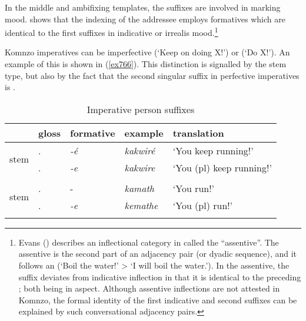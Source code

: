 In the middle and ambifixing templates, the  suffixes are involved in marking  mood.  shows that the indexing of the addressee employs formatives which are identical to the first  suffixes in indicative or irrealis mood.\footnote{Evans (\citeyear{Evans:2012ue}) describes an inflectional category in  called the ``assentive''. The assentive is the second part of an adjacency pair (or dyadic sequence), and it follows an  (`Boil the water!' > `I will boil the water.'). In the assentive, the  suffix deviates from indicative inflection in that it is identical to the preceding ; both being  in  aspect. Although assentive inflections are not attested in Komnzo, the formal identity of the first  indicative and second   suffixes can be explained by such conversational adjacency pairs.}

Komnzo imperatives can be imperfective (`Keep on doing X!') or  (`Do X!'). An example of this is shown in (\ref{ex766}). This distinction is signalled by the stem type, but also by the fact that the second singular suffix in perfective imperatives is .

\begin{table}
\caption{Imperative person suffixes}
\label{perssuffimp}
	\begin{tabularx}{\textwidth}{XXXXl}
		\lsptoprule
		&{gloss} &{formative} &{example} &{translation}\\\midrule
		\multirow{2}{*}{{\Ext} stem} &\Ssg.\Imp &\emph{-é}	&\emph{kakwiré} &`You keep running!'\\
		&\Snsg.\Imp	&\emph{-e} &\emph{kakwire} &`You (pl) keep running!'\\
		&&&&\\
		\multirow{2}{*}{{\Rs} stem} &\Ssg.\Imp &-\Zero &\emph{kamath} &`You run!'\\
		&\Snsg.\Imp	&\emph{-e} &\emph{kemathe} &`You (pl) run!'\\
		\lspbottomrule
	\end{tabularx}
\end{table}%

